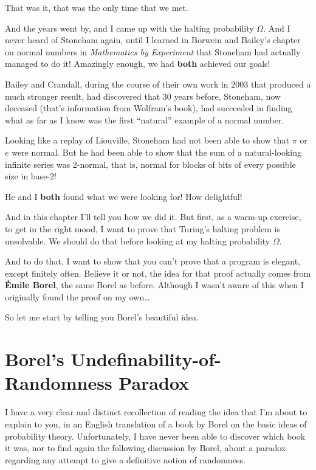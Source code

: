 \documentclass[12pt]{book}
\begin{document}
That was it, that was the only time that we met.
 
And the years went by, and I came up with the halting probability $\Omega$. And I never
heard of Stoneham again, until I learned in Borwein and Bailey's chapter on normal
numbers in \emph{Mathematics by Experiment} 
that Stoneham had actually managed to do it!  
Amazingly enough, we had \textbf{both} achieved our goals!
 
Bailey and Crandall, during the course of
their own work in 2003 that produced a much stronger result, had discovered that 30
years before, Stoneham, now deceased (that's information from Wolfram's book), had succeeded in
finding what as far as I know was the first ``natural'' example of a normal number.
 
Looking like a replay of Liouville, Stoneham had not been able to show that
$\pi$ or $e$ were normal.  But he had been able to show that the sum of a natural-looking
infinite series was 2-normal, that is, normal for blocks of bits of every possible size in base-2!
 
He and I \textbf{both} found what we were looking for!  
How delightful!
 
And in this chapter I'll tell you how we did it.  But first, as a warm-up
exercise, to get in the right mood, I want to prove that Turing's halting problem
is unsolvable.  We should do that before looking at my halting probability $\Omega$.
 
And to do that, I want to show that you can't prove that a program is elegant,
except finitely often.  Believe it or not, the idea for that proof actually comes
from \textbf{\'Emile Borel}, the same Borel as before.
Although I wasn't aware of this when I originally found the proof on my own\ldots
 
So let me start by telling you Borel's beautiful idea.

\section*{Borel's Undefinability-of-Randomness Paradox}
  
I have a very clear and distinct recollection of reading the idea that I'm about
to explain to you,
in an English translation of a book by Borel on the basic ideas of probability theory.
Unfortunately, 
I have never been able to discover which book it was, 
nor to find again the following discussion by Borel, 
about a paradox regarding any attempt to give a definitive notion of randomness.
 
\end{document}
